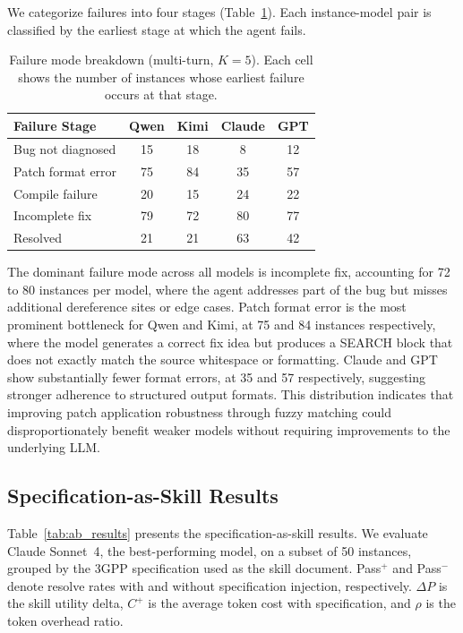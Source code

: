 \documentclass[10pt,conference]{IEEEtran}
\begin{document}
We categorize failures into four stages (Table~\ref{tab:failure}). Each instance-model pair is classified by the earliest stage at which the agent fails.

\begin{table}[t]
\centering
\caption{Failure mode breakdown (multi-turn, $K{=}5$). Each cell shows the number of instances whose earliest failure occurs at that stage.}
\label{tab:failure}
\begin{tabular}{@{}lcccc@{}}
\toprule
Failure Stage & Qwen & Kimi & Claude & GPT \\
\midrule
Bug not diagnosed     & 15 & 18 &  8 & 12 \\
Patch format error    & 75 & 84 & 35 & 57 \\
Compile failure       & 20 & 15 & 24 & 22 \\
Incomplete fix        & 79 & 72 & 80 & 77 \\
\midrule
Resolved              & 21 & 21 & 63 & 42 \\
\bottomrule
\end{tabular}
\end{table}

The dominant failure mode across all models is incomplete fix, accounting for 72 to 80 instances per model, where the agent addresses part of the bug but misses additional dereference sites or edge cases. Patch format error is the most prominent bottleneck for Qwen and Kimi, at 75 and 84 instances respectively, where the model generates a correct fix idea but produces a SEARCH block that does not exactly match the source whitespace or formatting. Claude and GPT show substantially fewer format errors, at 35 and 57 respectively, suggesting stronger adherence to structured output formats. This distribution indicates that improving patch application robustness through fuzzy matching could disproportionately benefit weaker models without requiring improvements to the underlying LLM.

\subsection{Specification-as-Skill Results}

Table~\ref{tab:ab_results} presents the specification-as-skill results. We evaluate Claude Sonnet~4, the best-performing model, on a subset of 50 instances, grouped by the 3GPP specification used as the skill document. Pass$^+$ and Pass$^-$ denote resolve rates with and without specification injection, respectively. $\Delta P$ is the skill utility delta, $C^+$ is the average token cost with specification, and $\rho$ is the token overhead ratio.
\end{document}
